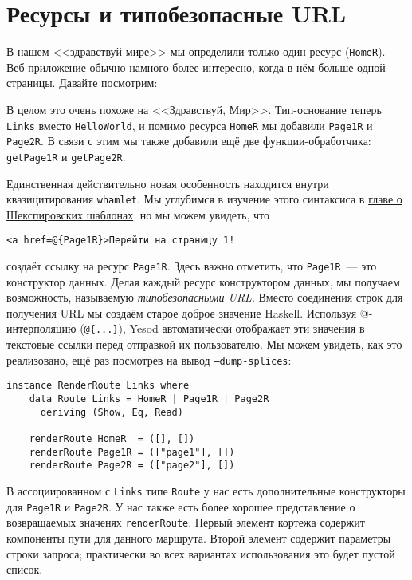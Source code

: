 \section{Ресурсы и типобезопасные URL}

В нашем <<здравствуй-мире>> мы определили только один ресурс
(\lstinline!HomeR!). Веб-приложение обычно намного более интересно, когда в нём
больше одной страницы. Давайте посмотрим:

В целом это очень похоже на <<Здравствуй, Мир>>. Тип-основание теперь
\lstinline!Links!  вместо \lstinline!HelloWorld!, и помимо ресурса
\lstinline!HomeR! мы добавили \lstinline!Page1R! и \lstinline!Page2R!. В связи
с этим мы также добавили ещё две функции-обработчика: \lstinline!getPage1R! и
\lstinline!getPage2R!.

Единственная действительно новая особенность находится внутри квазицитирования
\lstinline'whamlet'. Мы углубимся в изучение этого синтаксиса в
\hyperref[chap:shakespeare]{главе о Шекспировских шаблонах}, но мы можем
увидеть, что
\begin{lstlisting}
<a href=@{Page1R}>Перейти на страницу 1!
\end{lstlisting}
создаёт ссылку на ресурс \lstinline!Page1R!. Здесь важно отметить, что
\lstinline!Page1R!~--- это конструктор данных. Делая каждый ресурс
конструктором данных, мы получаем возможность, называемую \emph{типобезопасными
    URL}. Вместо соединения строк для получения URL мы создаём старое доброе
значение Haskell. Используя @-интерполяцию (\lstinline!@{...}!), Yesod
автоматически отображает эти значения в текстовые ссылки перед отправкой их
пользователю. Мы можем увидеть, как это реализовано, ещё раз посмотрев на вывод
\texttt{--dump-splices}:

\begin{lstlisting}
instance RenderRoute Links where
    data Route Links = HomeR | Page1R | Page2R
      deriving (Show, Eq, Read)

    renderRoute HomeR  = ([], [])
    renderRoute Page1R = (["page1"], [])
    renderRoute Page2R = (["page2"], [])
\end{lstlisting}

В ассоциированном с \lstinline!Links! типе \lstinline!Route! у нас есть
дополнительные конструкторы для \lstinline!Page1R! и \lstinline!Page2R!. У нас
также есть более хорошее представление о возвращаемых значенях
\lstinline!renderRoute!.  Первый элемент кортежа содержит компоненты пути для
данного маршрута. Второй элемент содержит параметры строки запроса; практически
во всех вариантах использования это будет пустой список.

